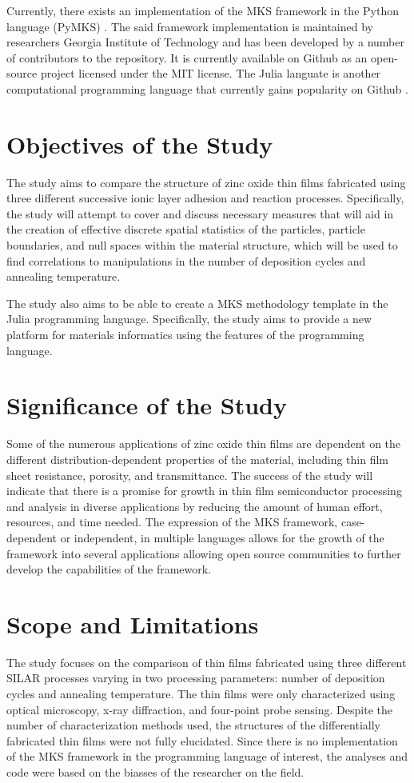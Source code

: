 Currently, there exists an implementation of the MKS framework in the Python language (PyMKS) \cite{pymks}.
The said framework implementation is maintained by researchers Georgia Institute of Technology and has been developed by a number of contributors to the repository.
It is currently available on Github as an open-source project licensed under the MIT license.
The Julia languate is another computational programming language that currently gains popularity on Github \cite{julia15}.

\section{Objectives of the Study}
The study aims to compare the structure of zinc oxide thin films fabricated using three different successive ionic layer adhesion and reaction processes.
Specifically, the study will attempt to cover and discuss necessary measures that will aid in the creation of effective discrete spatial statistics of the particles, particle boundaries, and null spaces within the material structure, which will be used to find correlations to manipulations in the number of deposition cycles and annealing temperature.

The study also aims to be able to create a MKS methodology template in the Julia programming language.
Specifically, the study aims to provide a new platform for materials informatics using the features of the programming language.

\section{Significance of the Study}
Some of the numerous applications of zinc oxide thin films are dependent on the different distribution-dependent properties of the material, including thin film sheet resistance, porosity, and transmittance.
The success of the study will indicate that there is a promise for growth in thin film semiconductor processing and analysis in diverse applications by reducing the amount of human effort, resources, and time needed.
The expression of the MKS framework, case-dependent or independent, in multiple languages allows for the growth of the framework into several applications allowing open source communities to further develop the capabilities of the framework.

\section{Scope and Limitations}
The study focuses on the comparison of thin films fabricated using three different SILAR processes varying in two processing parameters: number of deposition cycles and annealing temperature.
The thin films were only characterized using optical microscopy, x-ray diffraction, and four-point probe sensing.
Despite the number of characterization methods used, the structures of the differentially fabricated thin films were not fully elucidated.
Since there is no implementation of the MKS framework in the programming language of interest, the analyses and code were based on the biasses of the researcher on the field.
